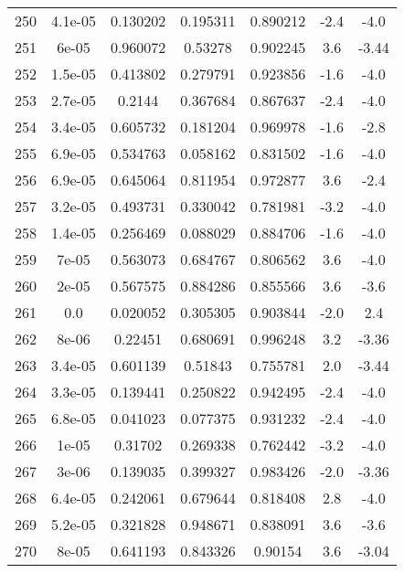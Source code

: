 \begin{table}
\begin{tabular}{c|c|c|c|c|c|c}
250 & 4.1e-05 & 0.130202 & 0.195311 & 0.890212 & -2.4 & -4.0\\
251 & 6e-05 & 0.960072 & 0.53278 & 0.902245 & 3.6 & -3.44\\
252 & 1.5e-05 & 0.413802 & 0.279791 & 0.923856 & -1.6 & -4.0\\
253 & 2.7e-05 & 0.2144 & 0.367684 & 0.867637 & -2.4 & -4.0\\
254 & 3.4e-05 & 0.605732 & 0.181204 & 0.969978 & -1.6 & -2.8\\
255 & 6.9e-05 & 0.534763 & 0.058162 & 0.831502 & -1.6 & -4.0\\
256 & 6.9e-05 & 0.645064 & 0.811954 & 0.972877 & 3.6 & -2.4\\
257 & 3.2e-05 & 0.493731 & 0.330042 & 0.781981 & -3.2 & -4.0\\
258 & 1.4e-05 & 0.256469 & 0.088029 & 0.884706 & -1.6 & -4.0\\
259 & 7e-05 & 0.563073 & 0.684767 & 0.806562 & 3.6 & -4.0\\
260 & 2e-05 & 0.567575 & 0.884286 & 0.855566 & 3.6 & -3.6\\
261 & 0.0 & 0.020052 & 0.305305 & 0.903844 & -2.0 & 2.4\\
262 & 8e-06 & 0.22451 & 0.680691 & 0.996248 & 3.2 & -3.36\\
263 & 3.4e-05 & 0.601139 & 0.51843 & 0.755781 & 2.0 & -3.44\\
264 & 3.3e-05 & 0.139441 & 0.250822 & 0.942495 & -2.4 & -4.0\\
265 & 6.8e-05 & 0.041023 & 0.077375 & 0.931232 & -2.4 & -4.0\\
266 & 1e-05 & 0.31702 & 0.269338 & 0.762442 & -3.2 & -4.0\\
267 & 3e-06 & 0.139035 & 0.399327 & 0.983426 & -2.0 & -3.36\\
268 & 6.4e-05 & 0.242061 & 0.679644 & 0.818408 & 2.8 & -4.0\\
269 & 5.2e-05 & 0.321828 & 0.948671 & 0.838091 & 3.6 & -3.6\\
270 & 8e-05 & 0.641193 & 0.843326 & 0.90154 & 3.6 & -3.04\\
\end{tabular}
\end{table}
\newpage
